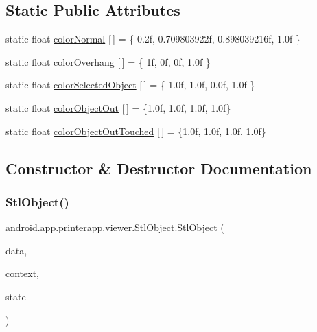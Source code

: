 \subsection*{Static Public Attributes}
\begin{DoxyCompactItemize}
\item 
static float \hyperlink{classandroid_1_1app_1_1printerapp_1_1viewer_1_1_stl_object_a93432b698d3cb1f9c0edf787a39236dd}{color\+Normal} \mbox{[}$\,$\mbox{]} = \{ 0.\+2f, 0.\+709803922f, 0.\+898039216f, 1.\+0f \}
\item 
static float \hyperlink{classandroid_1_1app_1_1printerapp_1_1viewer_1_1_stl_object_ac54cad808b7a3bd4d854416289ba14d9}{color\+Overhang} \mbox{[}$\,$\mbox{]} = \{ 1f, 0f, 0f, 1.\+0f \}
\item 
static float \hyperlink{classandroid_1_1app_1_1printerapp_1_1viewer_1_1_stl_object_a1f9eee41dd48a5bb73fd0289ab1a6b2c}{color\+Selected\+Object} \mbox{[}$\,$\mbox{]} = \{ 1.\+0f, 1.\+0f, 0.\+0f, 1.\+0f \}
\item 
static float \hyperlink{classandroid_1_1app_1_1printerapp_1_1viewer_1_1_stl_object_ad0c37e7465022f9632e703ef6f906df7}{color\+Object\+Out} \mbox{[}$\,$\mbox{]} = \{1.\+0f, 1.\+0f, 1.\+0f, 1.\+0f\}
\item 
static float \hyperlink{classandroid_1_1app_1_1printerapp_1_1viewer_1_1_stl_object_ad1d1e3205b1d6ae6f7cfc5ae05f0be83}{color\+Object\+Out\+Touched} \mbox{[}$\,$\mbox{]} = \{1.\+0f, 1.\+0f, 1.\+0f, 1.\+0f\}
\end{DoxyCompactItemize}


\subsection{Constructor \& Destructor Documentation}
\mbox{\label{classandroid_1_1app_1_1printerapp_1_1viewer_1_1_stl_object_a81effd21a9cab97912683917b4746bc8}} 
\subsubsection{\texorpdfstring{Stl\+Object()}{StlObject()}}
{\footnotesize\ttfamily android.\+app.\+printerapp.\+viewer.\+Stl\+Object.\+Stl\+Object (\begin{DoxyParamCaption}\item[{\hyperlink{classandroid_1_1app_1_1printerapp_1_1viewer_1_1_data_storage}{Data\+Storage}}]{data,  }\item[{Context}]{context,  }\item[{int}]{state }\end{DoxyParamCaption})}



